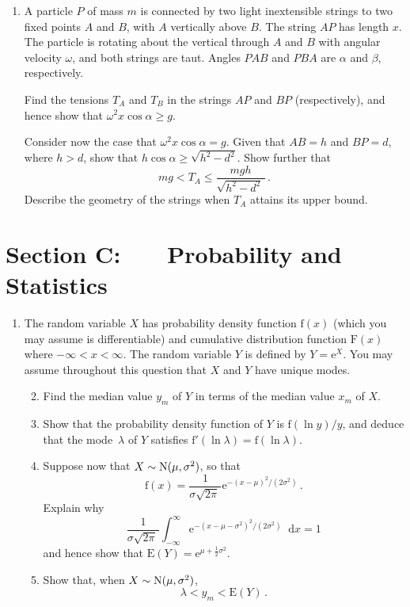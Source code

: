 \documentclass[a4, 11pt]{report}
\newlength{\qspace}
\newcounter{qnumber}
\newenvironment{question}%
 {\vspace{\qspace}
  \begin{enumerate}[\bfseries 1\quad][10]%
    \setcounter{enumi}{\value{qnumber}}%
    \item%
 }
{
  \end{enumerate}
  \filbreak
  \stepcounter{qnumber}
 }
\newenvironment{questionparts}[1][1]%
 {
  \begin{enumerate}[\bfseries (i)]%
    \setcounter{enumii}{#1}
    \addtocounter{enumii}{-1}
    \setlength{\itemsep}{5mm}
    \setlength{\parskip}{8pt}
 }
 {
  \end{enumerate}
 }
\def\le{\leqslant}
\def\ge{\geqslant}
\renewcommand{\.}[1]{\ensuremath{\mathrm{#1}}}
\newcommand{\+}[1]{\ensuremath{\mathbf{#1}}}
\newcommand{\ud}{\mathop{}\!\mathrm{d}}
\begin{document}

\begin{question}
  A particle $P$ of mass $m$ is connected by two light inextensible
  strings to two fixed points $A$ and $B$, with $A$ vertically above
  $B$. The string $AP$ has length $x$.  The particle is rotating about
  the vertical through $A$ and $B$ with angular velocity $\omega$, and
  both strings are taut.  Angles $PAB$ and $PBA$ are $\alpha$ and
  $\beta$, respectively.

  Find the tensions $T_A$ and $T_B$ in the strings $AP$ and $BP$
  (respectively), and hence show that $\omega^2 x\cos\alpha \ge g$.

  Consider now the case that $\omega^2 x\cos\alpha = g$.  Given that
  $AB=h$ and $BP=d$, where $h>d$,  show that
$h\cos\alpha \ge \sqrt{h^2-d^2}$. Show further that 
  \[
  mg < T_A \le \frac{mgh}{\sqrt{h^2-d^2}\,}\,.
  \]
  Describe the geometry of the strings when $T_A$ 
attains its upper bound.
\end{question}
	

	
	\newpage
\section*{Section C: \ \ \ Probability and Statistics}


\begin{question}
  The random variable $X$ has probability density function 
$\.f(x)$ (which you may assume is differentiable)
  and cumulative distribution function $\.F(x)$ where $-\infty < x <
  \infty$.  The random variable $Y$ is defined by $Y= \.e^X$.
You may assume throughout this question that $X$ and $Y$ have unique modes.
  \begin{questionparts}
  \item Find  the median value $y_m$ of $Y$ in terms of the
    median value $x_m$ of $X$.


  \item Show that the probability density function of $Y$ is $\.f(\ln
    y)/y$, and deduce that the mode~$\lambda$ of $Y$ satisfies 
$\.f'(\ln \lambda)
    = \.f(\ln \lambda)$.

  \item Suppose now that $X \sim {\rm N} (\mu,\sigma^2)$, so that
    \[
    \.f(x) = \frac{1}{\sigma \sqrt{2\pi}\,} \.e^{-(x-\mu)^2/(2\sigma^2)}
    \,.
    \]
    Explain why 
\[
\frac{1}{\sigma \sqrt{2\pi}\,}
    \int_{-\infty}^{\infty}\.e^{-(x-\mu-\sigma^2)^2/(2\sigma^2)} \ud x = 1
\] and hence show
    that $ \.E(Y) = \.e ^{\mu+\frac12\sigma^2}$.

  \item Show that, when $X \sim {\rm N} (\mu,\sigma^2)$,
    \[
   \lambda <y_m< \.E(Y)\,.
    \]

\end{questionparts}
\end{question}
\end{document}
